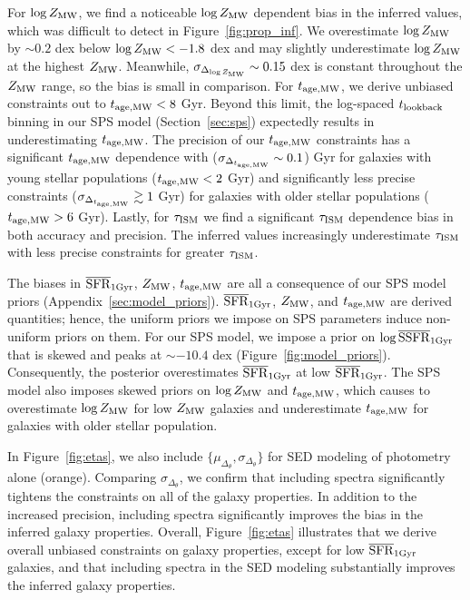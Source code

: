 For $\log Z_{\rm MW}$, we find a noticeable $\log Z_{\rm MW}$ dependent bias 
in the inferred values, which was difficult to detect in
Figure~\ref{fig:prop_inf}. 
We overestimate $\log Z_{\rm MW}$ by $\sim 0.2$ dex below $\log Z_{\rm MW} <
-1.8$ dex and may slightly underestimate $\log Z_{\rm MW}$ at the highest
$Z_{\rm MW}$. 
Meanwhile, $\sigma_{\Delta_{\log Z_{\rm MW}}} \sim 0.15$ dex is constant
throughout the $Z_{\rm MW}$ range, so the bias is small in comparison.
For $t_{\rm age, MW}$, we derive unbiased constraints out to 
$t_{\rm age, MW} < 8$ Gyr. 
Beyond this limit, the log-spaced $t_{\rm lookback}$ binning in our SPS model
(Section~\ref{sec:sps}) expectedly results in underestimating 
$t_{\rm age, MW}$. 
The precision of our $t_{\rm age, MW}$ constraints has a significant $t_{\rm age, MW}$ dependence 
with ($\sigma_{\Delta_{t_{\rm age, MW}}} \sim 0.1$) Gyr for galaxies with young
stellar populations ($t_{\rm age, MW} < 2$ Gyr) and significantly less precise
constraints ($\sigma_{\Delta_{t_{\rm age, MW}}} \gtrsim 1$ Gyr) for galaxies with older
stellar populations ($t_{\rm age, MW} > 6$ Gyr).
Lastly, for $\tau_{\rm ISM}$ we find a significant $\tau_{\rm ISM}$ dependence bias in both
accuracy and precision. 
The inferred values increasingly underestimate $\tau_{\rm ISM}$ with less precise
constraints for greater $\tau_{\rm ISM}$.

The biases in $\overline{\rm SFR}_{\rm 1Gyr}$, $Z_{\rm MW}$, $t_{\rm age, MW}$ are all a consequence of our SPS
model priors (Appendix~\ref{sec:model_priors}). 
$\overline{\rm SFR}_{\rm 1Gyr}$, $Z_{\rm MW}$, and $t_{\rm age, MW}$ are derived quantities; hence, the uniform
priors we impose on SPS parameters induce non-uniform priors on them.
For our SPS model, we impose a prior on $\log \overline{\rm SSFR}_{\rm 1 Gyr}$
that is skewed and peaks at ${\sim}-10.4$ dex (Figure~\ref{fig:model_priors}). 
Consequently, the posterior overestimates $\overline{\rm SFR}_{\rm 1Gyr}$ at low $\overline{\rm SFR}_{\rm 1Gyr}$.
The SPS model also imposes skewed priors on $\log Z_{\rm MW}$ and $t_{\rm age, MW}$,
which causes to overestimate $\log Z_{\rm MW}$ for low $Z_{\rm MW}$ galaxies
and underestimate $t_{\rm age, MW}$ for galaxies with older stellar population. 


In Figure~\ref{fig:etas}, we also include $\{\mu_{\Delta_{\theta}},
\sigma_{\Delta_{\theta}}\}$ for SED modeling of photometry alone (orange). 
Comparing $\sigma_{\Delta_{\theta}}$, we confirm that including spectra
significantly tightens the constraints on all of the galaxy properties. 
In addition to the increased precision, including spectra significantly
improves the bias in the inferred galaxy properties. 
Overall, Figure~\ref{fig:etas} illustrates that we derive overall unbiased
constraints on galaxy properties, except for low $\overline{\rm SFR}_{\rm 1Gyr}$ galaxies, and that
including spectra in the SED modeling substantially improves the inferred
galaxy properties. 

